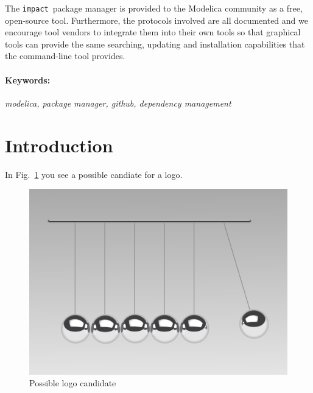 \documentclass[11pt,a4paper,twocolumn]{article}
\newcommand{\impact}{\texttt{impact}} %
\begin{document}
The \impact\ package manager is provided to the Modelica community as
a free, open-source tool.  Furthermore, the protocols involved are all
documented and we encourage tool vendors to integrate them into their
own tools so that graphical tools can provide the same searching,
updating and installation capabilities that the command-line tool
provides.

\paragraph{Keywords:}\emph{modelica, package manager, github, dependency management}

\section{Introduction}
\label{sec:intro}





In Fig.~\ref{fig:newtons_cradle} you see a possible candiate for a logo.


\begin{figure}[!ht]
  \centering
  \includegraphics[width=\columnwidth]{newtons_cradle}
  \caption{Possible logo candidate \cite{Andersson2007}}
  \label{fig:newtons_cradle}
\end{figure}
\end{document}
